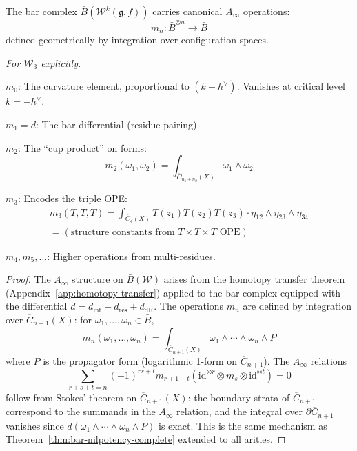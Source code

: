 \begin{theorem}\label{thm:w-ainfty-ops}
The bar complex $\bar{B}(\mathcal{W}^k(\mathfrak{g},f))$ carries canonical $A_\infty$ operations:
\begin{equation}
m_n: \bar{B}^{\otimes n} \to \bar{B}
\end{equation}
defined geometrically by integration over configuration spaces.

\emph{For $\mathcal{W}_3$ explicitly.}

$m_0$: The curvature element, proportional to $(k + h^\vee)$.  Vanishes at critical level $k = -h^\vee$.

$m_1 = d$: The bar differential (residue pairing).

$m_2$: The ``cup product'' on forms:
\begin{equation}
m_2(\omega_1, \omega_2) = \int_{\overline{C}_{n_1+n_2}(X)} \omega_1 \wedge \omega_2
\end{equation}

$m_3$: Encodes the triple OPE:
\begin{multline}
m_3(T, T, T) = \int_{\overline{C}_4(X)} T(z_1) T(z_2) T(z_3) \cdot \eta_{12} \wedge \eta_{23} \wedge \eta_{34} \\
= (\text{structure constants from } T \times T \times T \text{ OPE})
\end{multline}

$m_4, m_5, \ldots$: Higher operations from multi-residues.
\end{theorem}

\begin{proof}
The $A_\infty$ structure on $\bar{B}(\mathcal{W})$ arises from the homotopy transfer theorem (Appendix~\ref{app:homotopy-transfer}) applied to the bar complex equipped with the differential $d = d_{\mathrm{int}} + d_{\mathrm{res}} + d_{\mathrm{dR}}$.  The operations $m_n$ are defined by integration over $\overline{C}_{n+1}(X)$: for $\omega_1, \ldots, \omega_n \in \bar{B}$,
\[
m_n(\omega_1, \ldots, \omega_n) = \int_{\overline{C}_{n+1}(X)} \omega_1 \wedge \cdots \wedge \omega_n \wedge P
\]
where $P$ is the propagator form (logarithmic 1-form on $\overline{C}_{n+1}$).  The $A_\infty$ relations
\[
\sum_{r+s+t=n} (-1)^{rs+t} m_{r+1+t}(\mathrm{id}^{\otimes r} \otimes m_s \otimes \mathrm{id}^{\otimes t}) = 0
\]
follow from Stokes' theorem on $\overline{C}_{n+1}(X)$: the boundary strata of $\overline{C}_{n+1}$ correspond to the summands in the $A_\infty$ relation, and the integral over $\partial\overline{C}_{n+1}$ vanishes since $d(\omega_1 \wedge \cdots \wedge \omega_n \wedge P)$ is exact.  This is the same mechanism as Theorem~\ref{thm:bar-nilpotency-complete} extended to all arities.
\end{proof}


